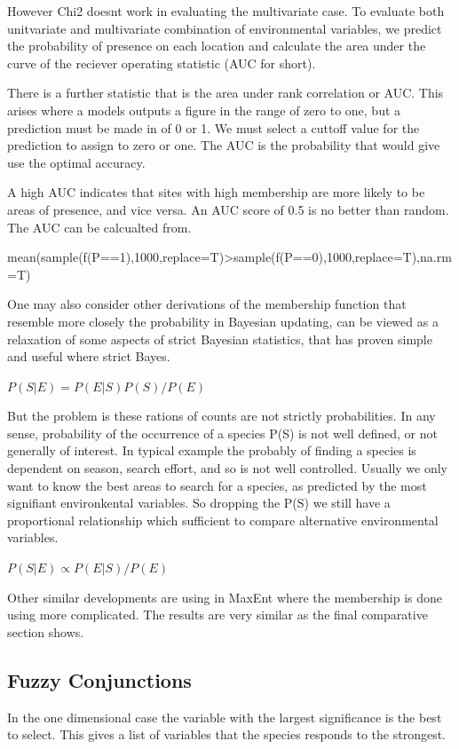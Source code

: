 \documentclass{article}
\begin{document}
However Chi2 doesnt work in evaluating the multivariate case.  To evaluate both unitvariate and multivariate combination of environmental variables, we predict the probability of presence on each location and calculate the area under the curve of the reciever operating statistic (AUC for short).  

There is a further statistic that is the area under rank correlation or AUC. This arises where a models outputs a figure in the range of zero to one, but a prediction must be made in of 0 or 1. We must select a cuttoff value for the prediction to assign to zero or one.  The AUC is the probability that would give use the optimal accuracy.

A high AUC indicates that sites with high membership are more likely to be areas of presence, and vice versa.  An AUC score of 0.5 is no better than random.  The AUC can be calcualted from.

mean(sample(f(P==1),1000,replace=T)>sample(f(P==0),1000,replace=T),na.rm=T)


One may also consider other derivations of the membership function that resemble more closely the probability in Bayesian updating, can be viewed as a relaxation of some aspects of strict Bayesian statistics, that has proven simple and useful where strict Bayes.  

$P(S|E)=P(E|S)P(S)/P(E)$

But the problem is these rations of counts are not strictly probabilities.  In any sense, probability of the occurrence of a species P(S) is not well defined, or not generally of interest.  In typical example the probably of finding a species is dependent on season, search effort, and so is not well controlled.  Usually we only want to know the best areas to search for a species, as predicted by the most signifiant environkental variables.  So dropping the P(S) we still have a proportional relationship which sufficient to compare alternative environmental variables.  

$P(S|E)\propto P(E|S)/P(E)$ 

Other similar developments are using in MaxEnt where the membership is done using more complicated.  The results are very similar as the final comparative section shows.

\subsection{Fuzzy Conjunctions}

In the one dimensional case the variable with the largest significance is the best to select.  This gives a list of variables that the species responds to the strongest.  
\end{document}
